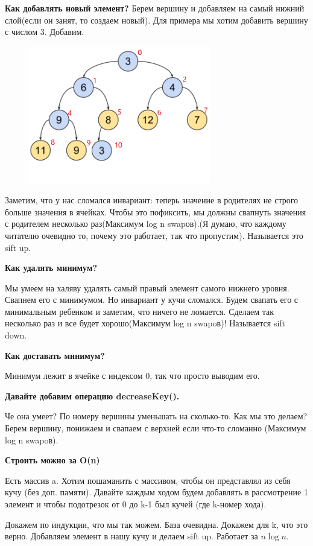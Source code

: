 \documentclass{article}
\begin{document}
\textbf{Как добавлять новый элемент?} Берем вершину и добавляем на самый нижний слой(если он занят, то создаем новый). Для примера мы хотим добавить вершину с числом 3.  Добавим.

 \includegraphics[width=10cm, height=6cm]{5.3.png}

Заметим, что у нас сломался инвариант: теперь значение в родителях не строго больше значения в ячейках. Чтобы это пофиксить, мы должны свапнуть значения с родителем несколько раз(Максимум log n swapов).(Я думаю, что каждому читателю очевидно то, почему это работает, так что пропустим). Называется это sift up.

\textbf{Как удалять минимум?}

Мы умеем на халяву удалять самый правый элемент самого нижнего уровня. Свапнем его с минимумом. Но инвариант у кучи сломался. Будем свапать его с минимальным ребенком и заметим, что ничего не ломается. Сделаем так несколько раз и все будет хорошо(Максимум log n swapoв)! Называется sift down.

\textbf{Как доставать минимум?}

Минимум лежит в ячейке с индексом 0, так что просто выводим его.

\textbf{Давайте добавим операцию decreaseKey().}

Че она умеет? По номеру вершины  уменьшать на сколько-то. Как мы это делаем? Берем вершину, понижаем и свапаем с верхней если что-то сломанно (Максимум log n swapoв). 

\textbf{Строить можно за O(n)}

Есть массив a. Хотим пошаманить с массивом, чтобы он представлял из себя кучу (без доп. памяти). Давайте каждым ходом будем добавлять в рассмотрение 1 элемент и чтобы подотрезок от 0 до k-1 был кучей (где k-номер хода).

Докажем по индукции, что мы так можем. База очевидна. Докажем для k, что это верно. Добавляем элемент в нашу кучу и делаем sift up. Работает за $n\log n$. 
\end{document}
